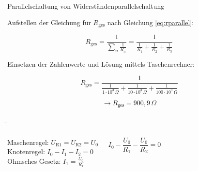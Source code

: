 \begin{frame}
{\begin{bsp}{Parallelschaltung von Widerständen}{parallelschaltung}
			\begin{center}










			\end{center}

			Aufstellen der Gleichung für $R_\mathrm{ges}$ nach Gleichung \ref{eq:rparallel}:



			\begin{equation*}
				R_\mathrm{ges} = \frac{1}{\sum_{n} \frac{1}{R_n}} = \frac{1}{\frac{1}{R_1} + \frac{1}{R_2}+ \frac{1}{R_3}}
			\end{equation*}

			Einsetzen der Zahlenwerte und Lösung mittels Taschenrechner:

			\begin{equation*}
				R_\mathrm{ges} = \frac{1}{\frac{1}{1\cdot 10^3 \, \Omega} + \frac{1}{10\cdot 10^3 \, \Omega} + \frac{1}{100 \cdot 10^3 \, \Omega}}
			\end{equation*}

			\begin{equation*}
				\rightarrow R_\mathrm{ges} = 900,9 \, \Omega
			\end{equation*}




		\end{bsp}


	}

	\b{
		\begin{columns}

			Maschenregel: $U_\mathrm{R1} = U_\mathrm{R2} = U_0$\\

			Knotenregel: $I_0 - I_1 - I_2 = 0$\\

			Ohmsches Gesetz: $I_1 = \frac{U_0}{R_1}$ %


			\begin{equation*}
				I_0 - \frac{U_0}{R_1} - \frac{U_0}{R_2} = 0
			\end{equation*}







\end{columns}}
\end{frame}
